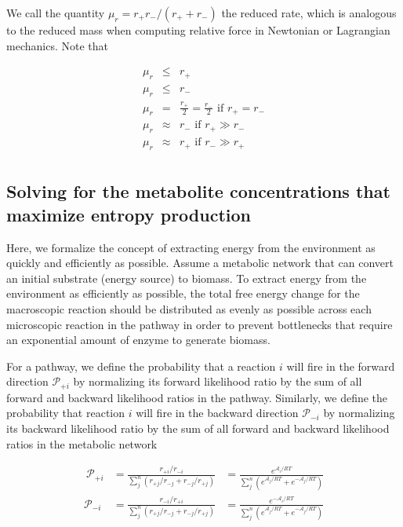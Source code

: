 \documentclass[10pt]{article}
\begin{document}
We call the quantity \(\mu_r = r_+r_-/(r_+ + r_-)\) the reduced rate, which is analogous to the reduced mass when computing relative force in Newtonian or Lagrangian mechanics.  Note that

\begin{eqnarray}
\mu_r&  \leq & r_+ \\
\mu_r & \leq &r_- \\
\mu_r &= & \frac{r_+}{2} = \frac{r_-}{2}  \text{  if } r_+ = r_- \\
\mu_r &\approx & r_-  \text{ if } r_+ \gg r_- \\
\mu_r &\approx &r_+  \text{ if } r_- \gg r_+ \\
\end{eqnarray}

\subsection{Solving for the metabolite concentrations that maximize entropy production}

Here, we formalize the concept of extracting energy from the environment as quickly and efficiently as possible. Assume a metabolic network that can convert an initial substrate (energy source) to biomass. To extract energy from the environment as efficiently as possible, the total free energy change for the macroscopic reaction should be distributed as evenly as possible across each microscopic reaction in the pathway in order to prevent bottlenecks that require an exponential amount of enzyme to generate biomass.


For a pathway, we define the probability that a reaction $i$ will fire in the forward  direction ${\mathcal P_{+i}}$ by normalizing its forward likelihood ratio by the sum of all forward and backward likelihood ratios in the pathway. Similarly, we define the probability that reaction $i$ will fire in the backward direction $\mathcal P_{-i}$ by normalizing its backward likelihood ratio by  the sum of all forward and backward likelihood ratios in the metabolic network



\begin{eqnarray}\
{\mathcal P}_{+i}  & =  \frac{r_{+i}/r_{-i}}{\sum_j^n\left(r_{+j}/r_{-j} + r_{-j}/r_{+j}  \right)} & =  \frac{e^{\mathcal A_i/RT}}{\sum_j^n \left( e^{\mathcal A_j/RT} + e^{-\mathcal A_j/RT}\right)} \\
{\mathcal P}_{-i}  & =  \frac{r_{-i}/r_{+i}}{\sum_j^n\left(r_{+j}/r_{-j} + r_{-j}/r_{+j}  \right)} & =  \frac{e^{-\mathcal A_i/RT}}{\sum_j^n \left(e^{\mathcal A_j/RT} + e^{-\mathcal A_j/RT}\right)} \\
\end{eqnarray}
\end{document}
